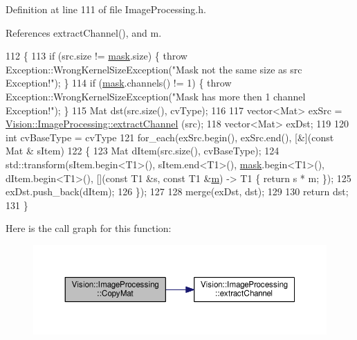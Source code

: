 Definition at line 111 of file Image\+Processing.\+h.



References extract\+Channel(), and m.


\begin{DoxyCode}
112         \{
113             \textcolor{keywordflow}{if} (src.size != \hyperlink{_gen_blob_8m_a5d76cc2129e79ba1941d2cc2f53b9e8e}{mask}.size) \{ \textcolor{keywordflow}{throw} Exception::WrongKernelSizeException(\textcolor{stringliteral}{"Mask not the same
       size as src Exception!"}); \}
114             \textcolor{keywordflow}{if} (\hyperlink{_gen_blob_8m_a5d76cc2129e79ba1941d2cc2f53b9e8e}{mask}.channels() != 1) \{ \textcolor{keywordflow}{throw} Exception::WrongKernelSizeException(\textcolor{stringliteral}{"Mask has more then 1
       channel Exception!"}); \}
115             Mat dst(src.size(), cvType);
116 
117             vector<Mat> exSrc = \hyperlink{class_vision_1_1_image_processing_ad5fa51caaabb8cb0fc2c15f645695a3c}{Vision::ImageProcessing::extractChannel}
      (src);
118             vector<Mat> exDst;
119 
120             \textcolor{keywordtype}{int} cvBaseType = cvType %
121             for\_each(exSrc.begin(), exSrc.end(), [&](\textcolor{keyword}{const} Mat & sItem) 
122             \{   
123                 Mat dItem(src.size(), cvBaseType);
124                 std::transform(sItem.begin<T1>(), sItem.end<T1>(), \hyperlink{_gen_blob_8m_a5d76cc2129e79ba1941d2cc2f53b9e8e}{mask}.begin<T1>(), dItem.begin<T1>(),
       [](\textcolor{keyword}{const} T1 &s, \textcolor{keyword}{const} T1 &\hyperlink{_gen_blob_8m_ab3cd915d758008bd19d0f2428fbb354a}{m}) -> T1 \{ return s * m; \});
125                 exDst.push\_back(dItem);
126             \});
127 
128             merge(exDst, dst);
129 
130             \textcolor{keywordflow}{return} dst;
131         \}
\end{DoxyCode}


Here is the call graph for this function\+:\nopagebreak
\begin{figure}[H]
\begin{center}
\leavevmode
\includegraphics[width=350pt]{class_vision_1_1_image_processing_a5a255d7f5b10bcb199e66d1e00ab9d1a_cgraph}
\end{center}
\end{figure}


